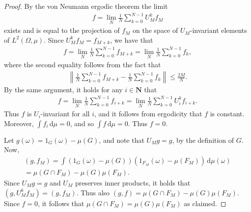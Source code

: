 \documentclass[10pt,a4paper]{amsart}
\newcommand{\NN}{\mathbf{N}}
\def\dd{\mathrm{d}}
\begin{document}
\begin{proof}
    By the von Neumann ergodic theorem the limit
    \begin{align*}
      f = \lim_N \frac{1}{N}\sum_{k=0}^{N-1} U_M^k f_M
    \end{align*}
    exists and is equal to the projection of $f_M$ on the space of $U_M$-invariant elements of $L^2(\Omega,\mu)$. Since $U_M^k f_M = f_{M+k}$, we have that
    \begin{align*}
      f = \lim_N \frac{1}{N}\sum_{k=0}^{N-1} f_{M+k} = \lim_N \frac{1}{N}\sum_{k=0}^{N-1} f_{k},
    \end{align*}
    where the second equality follows from the fact that
    \begin{align*}
      \left\| \frac{1}{N}\sum_{k=0}^{N-1} f_{M+k} - \frac{1}{N}\sum_{k=0}^{N-1} f_{k} \right\| \leq \frac{2M}{N}.
    \end{align*}
    By the same argument, it holds for any $i \in \NN$ that
    \begin{align*}
      f = \lim_N \frac{1}{N}\sum_{k=0}^{N-1} f_{i+k} = \lim_N \frac{1}{N}\sum_{k=0}^{N-1} U_i^kf_{i+k}.
    \end{align*}
    Thus $f$ is $U_i$-invariant for all $i$, and it follows from ergodicity that $f$ is constant. Moreover, $\int f_{i}\,\dd\mu = 0$, and so $\int f\,\dd\mu = 0$. Thus $f=0$.

    Let $g(\omega) = 1_G(\omega)-\mu(G)$, and note that $U_Mg=g$, by the definition of $G$. Now,
    \begin{multline*}
      (g,f_M) = \int (1_G(\omega)-\mu(G))(1_{F_M}(\omega) - \mu(F_M))\,\dd\mu(\omega)\\
      = \mu(G \cap F_M) - \mu(G)\mu(F_M).
    \end{multline*}
    Since $U_M g = g$ and $U_M$ preserves inner products, it holds that $(g,U_M^kf_M) = (g,f_M)$. Thus also $(g,f)=\mu(G \cap F_M) - \mu(G)\mu(F_M)$. Since $f=0$, it follows that $\mu(G \cap F_M) = \mu(G)\mu(F_M)$ as claimed.
\end{proof}
\end{document}
